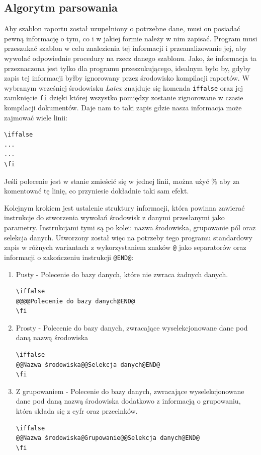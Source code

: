 \subsection{Algorytm parsowania}
Aby szablon raportu został uzupełniony o potrzebne dane, musi on posiadać pewną informację o tym, co i w jakiej formie należy w nim zapisać.  Program musi przeszukać szablon w celu znalezienia tej informacji i przeanalizowanie jej, aby wywołać odpowiednie procedury na rzecz danego szablonu. Jako, że informacja ta przeznaczona jest tylko dla programu przeszukującego, idealnym było by, gdyby zapis tej informacji byłby ignorowany przez środowisko kompilacji raportów.  W wybranym wcześniej środowisku \emph{Latex} znajduje się komenda \texttt{iffalse} oraz jej zamknięcie \texttt{fi} dzięki której wszystko pomiędzy zostanie zignorowane w czasie kompilacji dokumentów. Daje nam to taki zapis gdzie nasza informacja może zajmować wiele linii:
\begin{lstlisting}
\iffalse 
...
...
\fi
\end{lstlisting}
Jeśli polecenie jest w stanie zmieścić się w jednej linii, można użyć \% aby za komentować tę linię, co przyniesie dokładnie taki sam efekt.
\par
Kolejnym krokiem jest ustalenie struktury informacji, która powinna zawierać instrukcje do stworzenia wywołań środowisk z danymi przesłanymi jako parametry. Instrukcjami tymi są po kolei: nazwa środowiska, grupowanie pól oraz selekcja danych. Utworzony został więc na potrzeby tego programu standardowy zapis w różnych wariantach z wykorzystaniem znaków \texttt{@} jako separatorów oraz informacji o zakończeniu instrukcji \texttt{@END@}:\vspace{5mm}
\begin{enumerate}
\item Pusty - Polecenie do bazy danych, które nie zwraca żadnych danych.
\begin{lstlisting}
\iffalse 
@@@@Polecenie do bazy danych@END@
\fi
\end{lstlisting}

\item Prosty - Polecenie do bazy danych, zwracające wyselekcjonowane dane pod daną nazwą środowiska
\begin{lstlisting}
\iffalse 
@@Nazwa środowiska@@Selekcja danych@END@
\fi
\end{lstlisting}

\item Z grupowaniem - Polecenie do bazy danych, zwracające wyselekcjonowane dane pod daną nazwą środowiska dodatkowo z informacją o grupowaniu, która składa się z cyfr oraz przecinków.
\begin{lstlisting}
\iffalse 
@@Nazwa środowiska@Grupowanie@@Selekcja danych@END@
\fi
\end{lstlisting}
\end{enumerate}

